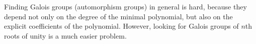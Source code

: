 \documentclass{ximera}
\begin{document}
  
Finding Galois groups (automorphism groups) in general is hard,
because they depend not only on the degree of the minimal polynomial,
but also on the explicit coefficients of the polynomial. However,
looking for Galois groups of $n$th roots of unity is a much easier
problem.
\end{document}

